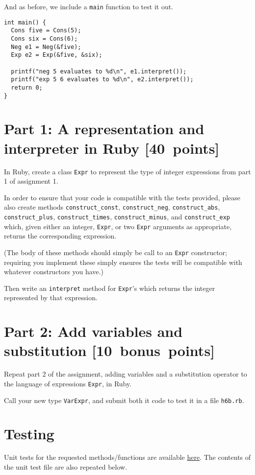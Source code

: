 \documentclass[11pt]{article}
\begin{document}
And as before, we include a \texttt{main} function to test it out.
\begin{verbatim}
int main() {
  Cons five = Cons(5);
  Cons six = Cons(6);
  Neg e1 = Neg(&five);
  Exp e2 = Exp(&five, &six);

  printf("neg 5 evaluates to %d\n", e1.interpret());
  printf("exp 5 6 evaluates to %d\n", e2.interpret());
  return 0;
}
\end{verbatim}

\section*{Part 1: A representation and interpreter in Ruby [40 points]}
\label{sec:org40602bf}
In Ruby, create a class \texttt{Expr} to represent
the type of integer expressions from part 1 of assignment 1.

In order to ensure that your code is compatible
with the tests provided, please also
create methods \texttt{construct\_const}, \texttt{construct\_neg}, \texttt{construct\_abs},
\texttt{construct\_plus}, \texttt{construct\_times}, \texttt{construct\_minus}, and \texttt{construct\_exp} which,
given either an integer, \texttt{Expr}, or two \texttt{Expr} arguments as appropriate,
returns the corresponding expression.

(The body of these methods should simply be call to an \texttt{Expr} constructor;
requiring you implement these simply ensures the tests will be
compatible with whatever constructors you have.)

Then write an \texttt{interpret} method for \texttt{Expr}'s which returns the integer
represented by that expression.

\section*{Part 2: Add variables and substitution           [10 bonus points]}
\label{sec:org6892ee4}
Repeat part 2 of the assignment,
adding variables and a substitution operator to the language
of expressions \texttt{Expr}, in Ruby.

Call your new type \texttt{VarExpr}, and submit both it code to test it
in a file \texttt{h6b.rb}.

\section*{Testing}
\label{sec:orga922b4c}
Unit tests for the requested methods/functions
are available \href{./testing/h6/h6t.rb}{here}.
The contents of the unit test file are also repeated below.
\end{document}
